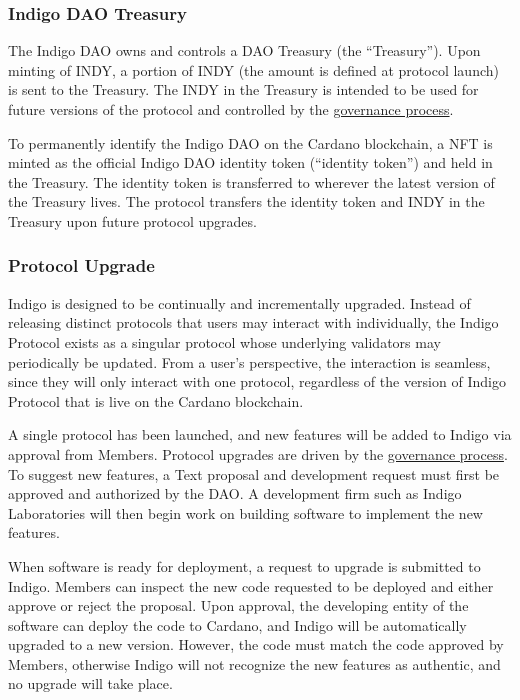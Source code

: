 \documentclass{article}
\begin{document}
\begin{sloppypar}
\hypertarget{indigo-dao-treasury}{%
\subsubsection{Indigo DAO Treasury}\label{indigo-dao-treasury}}

The Indigo DAO owns and controls a DAO Treasury (the ``Treasury''). Upon
minting of INDY, a portion of INDY (the amount is defined at protocol
launch) is sent to the Treasury. The INDY in the Treasury is intended to
be used for future versions of the protocol and controlled by the
\protect\hyperlink{governance-1}{governance process}.

To permanently identify the Indigo DAO on the Cardano blockchain, a NFT
is minted as the official Indigo DAO identity token (``identity token'')
and held in the Treasury. The identity token is transferred to wherever
the latest version of the Treasury lives. The protocol transfers the
identity token and INDY in the Treasury upon future protocol upgrades.

\hypertarget{protocol-upgrade}{%
\subsubsection{Protocol Upgrade}\label{protocol-upgrade}}

Indigo is designed to be continually and incrementally upgraded. Instead
of releasing distinct protocols that users may interact with
individually, the Indigo Protocol exists as a singular protocol whose
underlying validators may periodically be updated. From a user's
perspective, the interaction is seamless, since they will only interact
with one protocol, regardless of the version of Indigo Protocol that is
live on the Cardano blockchain.

A single protocol has been launched, and new features will be added to
Indigo via approval from Members. Protocol upgrades are driven by the
\protect\hyperlink{governance}{governance process}. To suggest new
features, a Text proposal and development request must first be approved
and authorized by the DAO. A development firm such as Indigo
Laboratories will then begin work on building software to implement the
new features.

When software is ready for deployment, a request to upgrade is submitted
to Indigo. Members can inspect the new code requested to be deployed and
either approve or reject the proposal. Upon approval, the developing
entity of the software can deploy the code to Cardano, and Indigo will
be automatically upgraded to a new version. However, the code must match
the code approved by Members, otherwise Indigo will not recognize the
new features as authentic, and no upgrade will take place.


\end{sloppypar}
\end{document}
